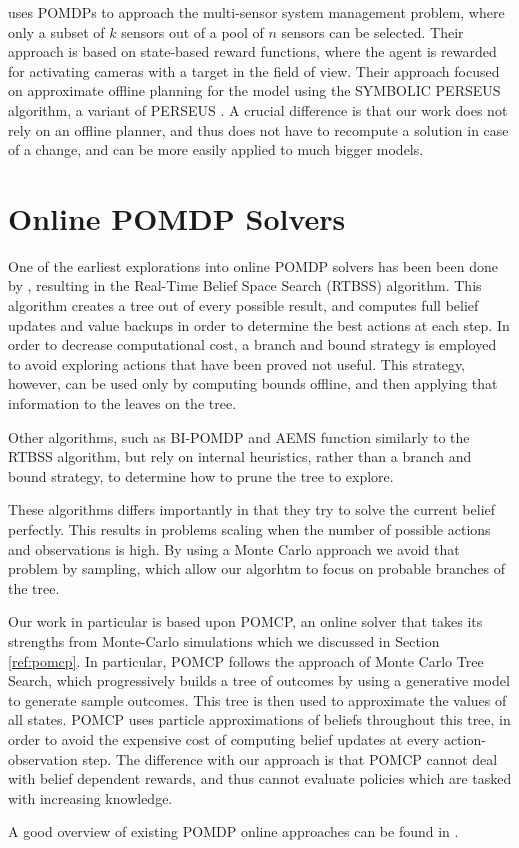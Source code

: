 \cite{cit:relworkspaan} uses POMDPs to approach the multi-sensor system management problem, where
only a subset of $k$ sensors out of a pool of $n$ sensors can be selected. Their approach is based
on state-based reward functions, where the agent is rewarded for activating cameras with a target in
the field of view. Their approach focused on approximate offline planning for the model using
the SYMBOLIC PERSEUS algorithm, a variant of PERSEUS \cite{cit:perseus}. A crucial difference
is that our work does not rely on an offline planner, and thus does not have to recompute a solution
in case of a change, and can be more easily applied to much bigger models.

\section{Online POMDP Solvers}

One of the earliest explorations into online POMDP solvers has been been done by
\cite{cit:relworkonline1}, resulting in the Real-Time Belief Space Search (RTBSS) algorithm. This
algorithm creates a tree out of every possible result, and computes full belief updates and value
backups in order to determine the best actions at each step. In order to decrease computational
cost, a branch and bound strategy is employed to avoid exploring actions that have been proved not
useful. This strategy, however, can be used only by computing bounds offline, and then applying that
information to the leaves on the tree.

Other algorithms, such as BI-POMDP \cite{cit:relworkonlinebi} and AEMS \cite{cit:relworkonlineaems}
function similarly to the RTBSS algorithm, but rely on internal heuristics, rather than a branch and
bound strategy, to determine how to prune the tree to explore.

These algorithms differs importantly in that they try to solve the current belief perfectly. This
results in problems scaling when the number of possible actions and observations is high. By using
a Monte Carlo approach we avoid that problem by sampling, which allow our algorhtm to focus on
probable branches of the tree.

%

Our work in particular is based upon POMCP, an online solver that takes its strengths from
Monte-Carlo simulations \cite{cit:pomcp} which we discussed in Section \ref{ref:pomcp}. In
particular, POMCP follows the approach of Monte Carlo Tree Search, which progressively builds a tree
of outcomes by using a generative model to generate sample outcomes. This tree is then used to
approximate the values of all states. POMCP uses particle approximations of beliefs throughout this
tree, in order to avoid the expensive cost of computing belief updates at every action-observation
step. The difference with our approach is that POMCP cannot deal with belief dependent rewards, and
thus cannot evaluate policies which are tasked with increasing knowledge.

A good overview of existing POMDP online approaches can be found in \cite{cit:relworkonlineall}.
